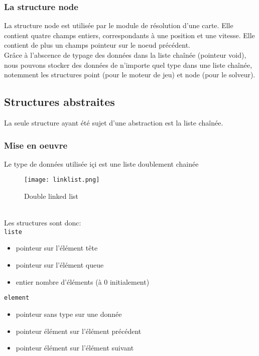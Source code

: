 	\subsubsection{La structure node}
    La structure node est utilisée par le module de résolution d'une carte. Elle contient quatre champs entiers, correspondants à une position et une vitesse. Elle contient de plus un champs pointeur sur le noeud précédent.\\

Grâce à l'abscence de typage des données dans la liste chaînée (pointeur void), nous pouvons stocker des données de n'importe quel type dans une liste chaînée, notemment les structures point (pour le moteur de jeu) et node (pour le solveur).



	\subsection{Structures abstraites}	
    La seule structure ayant été sujet d'une abstraction est la liste chaînée.
	\subsubsection{Mise en oeuvre}
	Le type de données utilisée içi est une liste doublement chainée	
	\begin{figure}[h]
	\centering
	\texttt{[image: linklist.png]}
    \caption{Double linked list}
    \end{figure} \\
    Les structures sont donc: \\
	\texttt{liste}
	\begin{itemize}
	\item pointeur sur l'élément tête
	\item pointeur sur l'élément queue
	\item entier nombre d'éléments (à 0 initialement)
	\end{itemize}
	\texttt{element}
    \begin{itemize}
	\item pointeur sans type sur une donnée
	\item pointeur élément sur l'élément précédent
	\item pointeur élément sur l'élément suivant
	\end{itemize}
